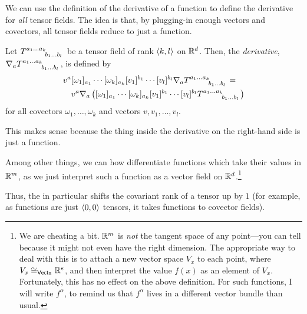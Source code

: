 We can use the definition of the derivative of a function to define the derivative for \emph{all} tensor fields.  The idea is that, by plugging-in enough vectors and covectors, all tensor fields reduce to just a function.
\begin{dfn}\label{DerivativeTensor}
Let $T\indices{^{a_1\ldots a_k}_{b_1\ldots b_l}}$ be a tensor field of rank $\langle k,l\rangle$ on $\mathbb{R} ^d$.  Then, the \emph{derivative}, $\nabla _aT\indices{^{a_1\ldots a_k}_{b_1\ldots b_l}}$, is defined by
\begin{equation}
\begin{multlined}
v^a[\omega _1]_{a_1}\cdots [\omega _k]_{a_k}[v_1]^{b_1}\cdots [v_l]^{b_l}\nabla _aT\indices{^{a_1\ldots a_k}_{b_1\ldots b_l}}= \\ v^a\nabla _a\left( [\omega _1]_{a_1}\cdots [\omega _k]_{a_k}[v_1]^{b_1}\cdots [v_l]^{b_l}T\indices{^{a_1\ldots a_k}_{b_1\ldots b_l}}\right) 
\end{multlined}
\end{equation}
for all covectors $\omega _1,\ldots ,\omega _k$ and vectors $v,v_1,\ldots ,v_l$.
\begin{rmk}
This makes sense because the thing inside the derivative on the right-hand side is just a function.
\end{rmk}
\begin{rmk}
Among other things, we can how differentiate functions which take their values in $\mathbb{R} ^m$, as we just interpret such a function as a vector field on $\mathbb{R} ^d$.\footnote{We are cheating a bit.  $\mathbb{R} ^m$ is \emph{not} the tangent space of any point---you can tell because it might not even have the right dimension.  The appropriate way to deal with this is to attach a new vector space $V_x$ to each point, where $V_x\cong _{\mathsf{Vect} _{\mathbb{R}}}\mathbb{R} ^e$, and then interpret the value $f(x)$ as an element of $V_x$.  Fortunately, this has no effect on the above definition.  For such functions, I will write $f^\alpha$, to remind us that $f^\alpha$ lives in a different vector bundle than usual.}
\end{rmk}
\begin{rmk}
Thus, the  in particular shifts the covariant rank of a tensor up by $1$ (for example, as functions are just $\langle0,0\rangle$ tensors, it takes functions to covector fields).
\end{rmk}
\end{dfn}
